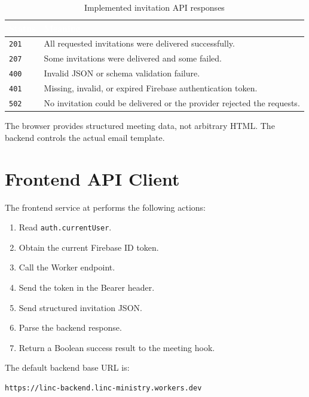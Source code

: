 \documentclass[11pt,a4paper,oneside]{report}
\begin{document}
\begin{table}[H]
\centering
{}
\begin{tabularx}{\linewidth}{@{}l X@{}}
\toprule
\rowcolor{primary}
\textcolor{white}{\textbf{Status}} & \textcolor{white}{\textbf{Meaning}} \\
\midrule
\texttt{201} & All requested invitations were delivered successfully. \\
\texttt{207} & Some invitations were delivered and some failed. \\
\texttt{400} & Invalid JSON or schema validation failure. \\
\texttt{401} & Missing, invalid, or expired Firebase authentication token. \\
\texttt{502} & No invitation could be delivered or the provider rejected the requests. \\
\bottomrule
\end{tabularx}
\caption{Implemented invitation API responses}
\end{table}

The browser provides structured meeting data, not arbitrary HTML. The backend controls the actual email template.

\section{Frontend API Client}

The frontend service at  performs the following actions:

\begin{enumerate}
  \item Read \texttt{auth.currentUser}.
  \item Obtain the current Firebase ID token.
  \item Call the Worker endpoint.
  \item Send the token in the Bearer header.
  \item Send structured invitation JSON.
  \item Parse the backend response.
  \item Return a Boolean success result to the meeting hook.
\end{enumerate}

The default backend base URL is:

\begin{lstlisting}
https://linc-backend.linc-ministry.workers.dev
\end{lstlisting}
\end{document}
